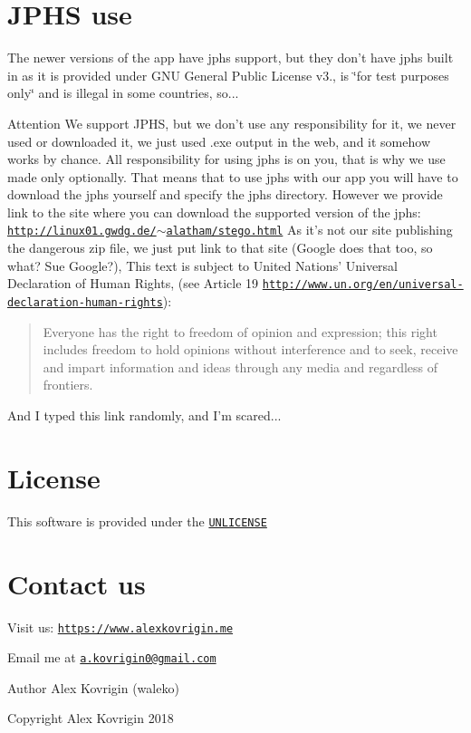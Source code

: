 \hypertarget{index_jphs-use}{}\section{J\-P\-H\-S use}\label{index_jphs-use}
The newer versions of the app have jphs support, but they don't have jphs built in as it is provided under G\-N\-U General Public License v3., is \char`\"{}for test purposes only\char`\"{} and is illegal in some countries, so... \begin{DoxyAttention}{Attention}
We support J\-P\-H\-S, but we don't use any responsibility for it, we never used or downloaded it, we just used .exe output in the web, and it somehow works by chance. All responsibility for using jphs is on you, that is why we use made only optionally. That means that to use jphs with our app you will have to download the jphs yourself and specify the jphs directory. However we provide link to the site where you can download the supported version of the jphs\-: \href{http://linux01.gwdg.de/~alatham/stego.html}{\tt http\-://linux01.\-gwdg.\-de/$\sim$alatham/stego.\-html} As it's not our site publishing the dangerous zip file, we just put link to that site (Google does that too, so what? Sue Google?), This text is subject to United Nations' Universal Declaration of Human Rights, (see Article 19 \href{http://www.un.org/en/universal-declaration-human-rights}{\tt http\-://www.\-un.\-org/en/universal-\/declaration-\/human-\/rights})\-: \begin{quotation}
Everyone has the right to freedom of opinion and expression; this right includes freedom to hold opinions without interference and to seek, receive and impart information and ideas through any media and regardless of frontiers.

\end{quotation}
And I typed this link randomly, and I'm scared...
\end{DoxyAttention}
\hypertarget{index_lic}{}\section{License}\label{index_lic}
This software is provided under the \href{http://unlicense.org}{\tt U\-N\-L\-I\-C\-E\-N\-S\-E}\hypertarget{index_contact}{}\section{Contact us}\label{index_contact}
Visit us\-: \href{https://www.alexkovrigin.me}{\tt https\-://www.\-alexkovrigin.\-me}

Email me at \href{mailto:a.kovrigin0@gmail.com}{\tt a.\-kovrigin0@gmail.\-com}

\begin{DoxyAuthor}{Author}
Alex Kovrigin (waleko) 
\end{DoxyAuthor}
\begin{DoxyCopyright}{Copyright}
Alex Kovrigin 2018  
\end{DoxyCopyright}
